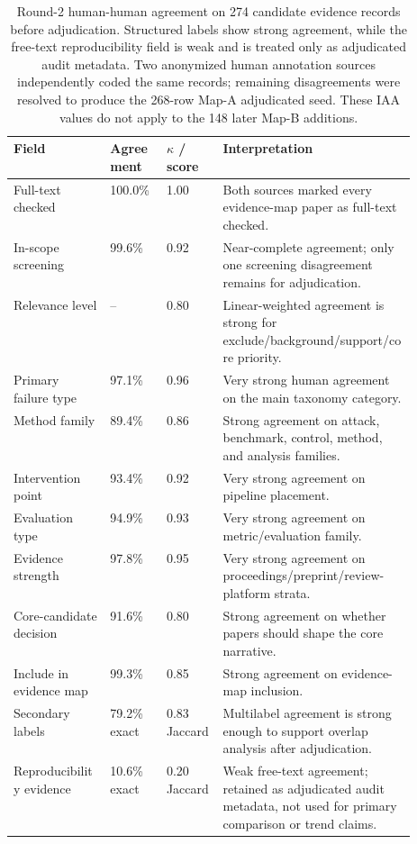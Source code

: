 \begin{table}[t]
\centering
\scriptsize
\begin{tabularx}{\linewidth}{p{0.24\linewidth}p{0.14\linewidth}p{0.14\linewidth}X}
\toprule
\textbf{Field} & \textbf{Agreement} & \textbf{$\kappa$ / score} & \textbf{Interpretation} \\
\midrule
Full-text checked & 100.0\% & 1.00 & Both sources marked every evidence-map paper as full-text checked. \\
In-scope screening & 99.6\% & 0.92 & Near-complete agreement; only one screening disagreement remains for adjudication. \\
Relevance level & -- & 0.80 & Linear-weighted agreement is strong for exclude/background/support/core priority. \\
Primary failure type & 97.1\% & 0.96 & Very strong human agreement on the main taxonomy category. \\
Method family & 89.4\% & 0.86 & Strong agreement on attack, benchmark, control, method, and analysis families. \\
Intervention point & 93.4\% & 0.92 & Very strong agreement on pipeline placement. \\
Evaluation type & 94.9\% & 0.93 & Very strong agreement on metric/evaluation family. \\
Evidence strength & 97.8\% & 0.95 & Very strong agreement on proceedings/preprint/review-platform strata. \\
Core-candidate decision & 91.6\% & 0.80 & Strong agreement on whether papers should shape the core narrative. \\
Include in evidence map & 99.3\% & 0.85 & Strong agreement on evidence-map inclusion. \\
Secondary labels & 79.2\% exact & 0.83 Jaccard & Multilabel agreement is strong enough to support overlap analysis after adjudication. \\
Reproducibility evidence & 10.6\% exact & 0.20 Jaccard & Weak free-text agreement; retained as adjudicated audit metadata, not used for primary comparison or trend claims. \\
\bottomrule
\end{tabularx}
\caption{Round-2 human-human agreement on 274 candidate evidence records before adjudication. Structured labels show strong agreement, while the free-text reproducibility field is weak and is treated only as adjudicated audit metadata. Two anonymized human annotation sources independently coded the same records; remaining disagreements were resolved to produce the 268-row Map-A adjudicated seed. These IAA values do not apply to the 148 later Map-B additions.}
\label{tab:iaa}
\end{table}

